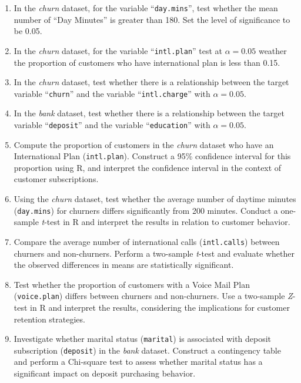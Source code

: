 \documentclass[
  11pt,
]{book}
\newcommand{\passthrough}[1]{#1}
\theoremstyle{definition}
\theoremstyle{definition}
\theoremstyle{definition}
\theoremstyle{definition}
\theoremstyle{remark}
\begin{document}
\begin{enumerate}
\def\labelenumi{\arabic{enumi}.}
\setcounter{enumi}{15}
\item
  In the \emph{churn} dataset, for the variable ``\passthrough{\lstinline!day.mins!}'', test whether the mean number of ``Day Minutes'' is greater than 180. Set the level of significance to be 0.05.
\item
  In the \emph{churn} dataset, for the variable ``\passthrough{\lstinline!intl.plan!}'' test at \(\alpha=0.05\) weather the proportion of customers who have international plan is less than 0.15.
\item
  In the \emph{churn} dataset, test whether there is a relationship between the target variable ``\passthrough{\lstinline!churn!}'' and the variable ``\passthrough{\lstinline!intl.charge!}'' with \(\alpha=0.05\).
\item
  In the \emph{bank} dataset, test whether there is a relationship between the target variable ``\passthrough{\lstinline!deposit!}'' and the variable ``\passthrough{\lstinline!education!}'' with \(\alpha=0.05\).
\item
  Compute the proportion of customers in the \emph{churn} dataset who have an International Plan (\passthrough{\lstinline!intl.plan!}). Construct a 95\% confidence interval for this proportion using R, and interpret the confidence interval in the context of customer subscriptions.
\item
  Using the \emph{churn} dataset, test whether the average number of daytime minutes (\passthrough{\lstinline!day.mins!}) for churners differs significantly from 200 minutes. Conduct a one-sample \emph{t}-test in R and interpret the results in relation to customer behavior.
\item
  Compare the average number of international calls (\passthrough{\lstinline!intl.calls!}) between churners and non-churners. Perform a two-sample \emph{t}-test and evaluate whether the observed differences in means are statistically significant.
\item
  Test whether the proportion of customers with a Voice Mail Plan (\passthrough{\lstinline!voice.plan!}) differs between churners and non-churners. Use a two-sample \emph{Z}-test in R and interpret the results, considering the implications for customer retention strategies.
\item
  Investigate whether marital status (\passthrough{\lstinline!marital!}) is associated with deposit subscription (\passthrough{\lstinline!deposit!}) in the \emph{bank} dataset. Construct a contingency table and perform a Chi-square test to assess whether marital status has a significant impact on deposit purchasing behavior.

\end{enumerate}
\end{document}
